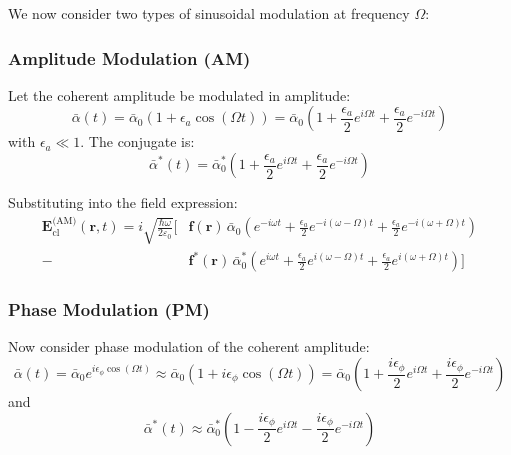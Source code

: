 We now consider two types of sinusoidal modulation at frequency $\Omega$:

\subsubsection*{Amplitude Modulation (AM)}

Let the coherent amplitude be modulated in amplitude:
\begin{equation}
    \bar{\alpha}(t) = \bar{\alpha}_0 \left(1 + \epsilon_a \cos(\Omega t)\right)
    = \bar{\alpha}_0 \left(1 + \frac{\epsilon_a}{2} e^{i\Omega t} + \frac{\epsilon_a}{2} e^{-i\Omega t} \right)
\end{equation}
with $\epsilon_a \ll 1$. The conjugate is:
\begin{equation}
    \bar{\alpha}^*(t) = \bar{\alpha}_0^* \left(1 + \frac{\epsilon_a}{2} e^{i\Omega t} + \frac{\epsilon_a}{2} e^{-i\Omega t} \right)
\end{equation}

Substituting into the field expression:
\begin{align}
    \mathbf{E}_{\text{cl}}^{\text{(AM)}}(\mathbf{r}, t) =
    i \sqrt{\frac{\hbar \omega}{2 \varepsilon_0}} \Big[
    &\mathbf{f}(\mathbf{r})\, \bar{\alpha}_0 \left( e^{-i\omega t} + \frac{\epsilon_a}{2} e^{-i(\omega - \Omega)t} + \frac{\epsilon_a}{2} e^{-i(\omega + \Omega)t} \right) \nonumber \\
    - &\mathbf{f}^*(\mathbf{r})\, \bar{\alpha}_0^* \left( e^{i\omega t} + \frac{\epsilon_a}{2} e^{i(\omega - \Omega)t} + \frac{\epsilon_a}{2} e^{i(\omega + \Omega)t} \right)
    \Big]
\end{align}

\subsubsection*{Phase Modulation (PM)}

Now consider phase modulation of the coherent amplitude:
\begin{equation}
    \bar{\alpha}(t) = \bar{\alpha}_0 e^{i \epsilon_\phi \cos(\Omega t)}
    \approx \bar{\alpha}_0 \left(1 + i \epsilon_\phi \cos(\Omega t)\right)
    = \bar{\alpha}_0 \left(1 + \frac{i \epsilon_\phi}{2} e^{i\Omega t} + \frac{i \epsilon_\phi}{2} e^{-i\Omega t} \right)
\end{equation}
and
\begin{equation}
    \bar{\alpha}^*(t) \approx \bar{\alpha}_0^* \left(1 - \frac{i \epsilon_\phi}{2} e^{i\Omega t} - \frac{i \epsilon_\phi}{2} e^{-i\Omega t} \right)
\end{equation}

